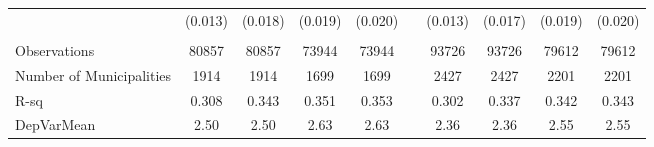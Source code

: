 \begin{tabular}{lccccccccc}
      & (0.013) & (0.018) & (0.019) & (0.020) &       & (0.013) & (0.017) & (0.019) & (0.020) \\
      &       &       &       &       &       &       &       &       &  \\
\midrule
Observations & 80857 & 80857 & 73944 & 73944 &       & 93726 & 93726 & 79612 & 79612 \\
Number of Municipalities & 1914  & 1914  & 1699  & 1699  &       & 2427  & 2427  & 2201  & 2201 \\
R-sq  & 0.308 & 0.343 & 0.351 & 0.353 &       & 0.302 & 0.337 & 0.342 & 0.343 \\
DepVarMean & 2.50  & 2.50  & 2.63  & 2.63  &       & 2.36  & 2.36  & 2.55  & 2.55 \\
\bottomrule
\bottomrule
\end{tabular}%
